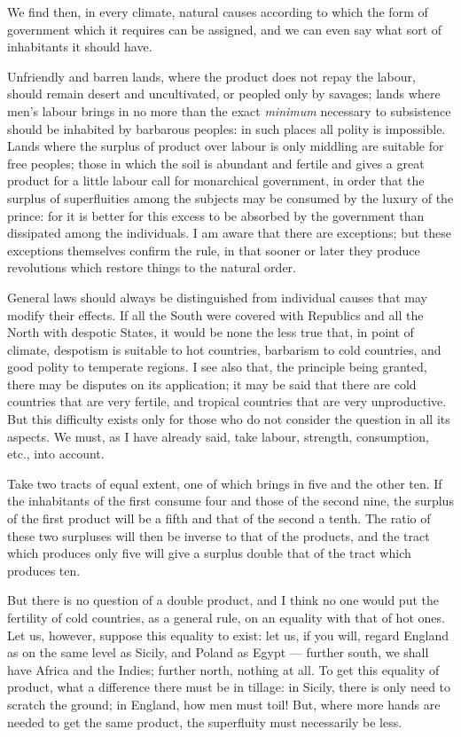 \documentclass[12pt]{report}
\begin{document}
We find then, in every climate, natural causes according to which the form of government which it requires can be assigned, and we can even say what sort of inhabitants it should have.

Unfriendly and barren lands, where the product does not repay the labour, should remain desert and uncultivated, or peopled only by savages; lands where men's labour brings in no more than the exact \textit{minimum} necessary to subsistence should be inhabited by barbarous peoples: in such places all polity is impossible. Lands where the surplus of product over labour is only middling are suitable for free peoples; those in which the soil is abundant and fertile and gives a great product for a little labour call for monarchical government, in order that the surplus of superfluities among the subjects may be consumed by the luxury of the prince: for it is better for this excess to be absorbed by the government than dissipated among the individuals. I am aware that there are exceptions; but these exceptions themselves confirm the rule, in that sooner or later they produce revolutions which restore things to the natural order.

General laws should always be distinguished from individual causes that may modify their effects. If all the South were covered with Republics and all the North with despotic States, it would be none the less true that, in point of climate, despotism is suitable to hot countries, barbarism to cold countries, and good polity to temperate regions. I see also that, the principle being granted, there may be disputes on its application; it may be said that there are cold countries that are very fertile, and tropical countries that are very unproductive. But this difficulty exists only for those who do not consider the question in all its aspects. We must, as I have already said, take labour, strength, consumption, etc., into account.

Take two tracts of equal extent, one of which brings in five and the other ten. If the inhabitants of the first consume four and those of the second nine, the surplus of the first product will be a fifth and that of the second a tenth. The ratio of these two surpluses will then be inverse to that of the products, and the tract which produces only five will give a surplus double that of the tract which produces ten.

But there is no question of a double product, and I think no one would put the fertility of cold countries, as a general rule, on an equality with that of hot ones. Let us, however, suppose this equality to exist: let us, if you will, regard England as on the same level as Sicily, and Poland as Egypt — further south, we shall have Africa and the Indies; further north, nothing at all. To get this equality of product, what a difference there must be in tillage: in Sicily, there is only need to scratch the ground; in England, how men must toil! But, where more hands are needed to get the same product, the superfluity must necessarily be less.
\end{document}

